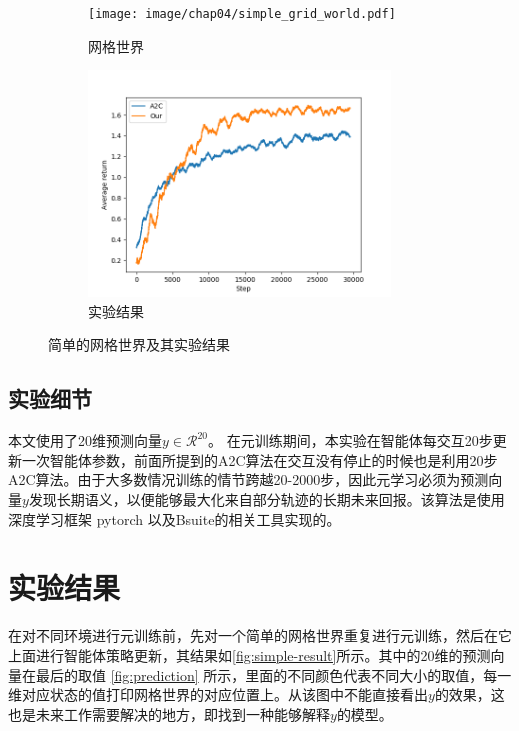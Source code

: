 \begin{figure}[h!] %
    \begin{subfigure}{0.48\textwidth}
        \centering
        \texttt{[image: image/chap04/simple\_grid\_world.pdf]}
        \caption{网格世界}
        \label{fig:simple-gridworld}
    \end{subfigure}
    \begin{subfigure}{0.48\textwidth}
        \centering
        \includegraphics[width=0.88\textwidth]{image/chap04/simple.png}
        \caption{实验结果}
        \label{fig:simple-result}
    \end{subfigure}
    \caption{简单的网格世界及其实验结果}
    \label{fig:simple}
\end{figure}


\subsection{实验细节}


本文使用了20维预测向量$y \in \mathcal{R}^{20}$。 在元训练期间，本实验在智能体每交互20步更新一次智能体参数，前面所提到的A2C算法在交互没有停止的时候也是利用20步A2C算法。由于大多数情况训练的情节跨越20-2000步，因此元学习必须为预测向量$y$发现长期语义，以便能够最大化来自部分轨迹的长期未来回报。该算法是使用深度学习框架 pytorch \cite{paszkePytorchImperativeStyle2019} 以及Bsuite的相关工具实现的。

\section{实验结果}
在对不同环境进行元训练前，先对一个简单的网格世界重复进行元训练，然后在它上面进行智能体策略更新，其结果如\autoref{fig:simple-result}所示。其中的20维的预测向量在最后的取值 \autoref{fig:prediction} 所示，里面的不同颜色代表不同大小的取值，每一维对应状态的值打印网格世界的对应位置上。从该图中不能直接看出$y$的效果，这也是未来工作需要解决的地方，即找到一种能够解释$y$的模型。

